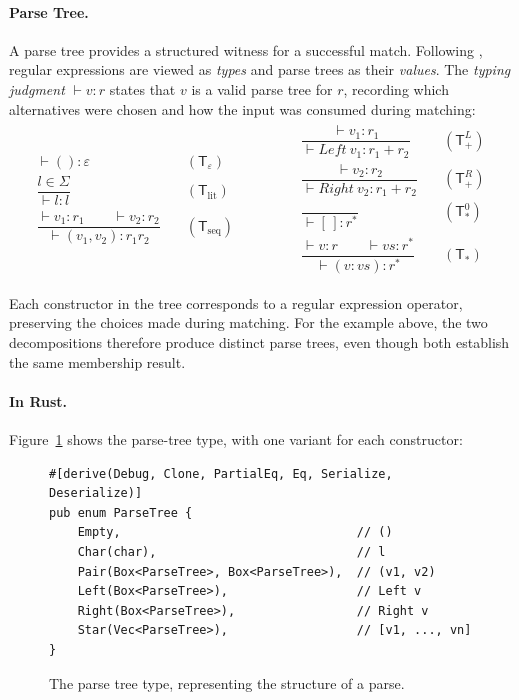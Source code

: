 \paragraph{Parse Tree.}
A parse tree provides a structured witness
for a successful match.
Following \citet[Fig.~1]{sulzmannlu2014},
regular expressions are viewed as \emph{types}
and parse trees as their \emph{values}.
The \emph{typing judgment} $\vdash v : r$
states that $v$ is a valid parse tree for $r$,
recording which alternatives were chosen
and how the input was consumed during matching:
\begin{equation}
\label{eq:typing-rules}
\begin{aligned}
\begin{aligned}
\vdash () : \varepsilon
&
\quad(\mathsf{T}_{\varepsilon})
\\[1.0em]
\dfrac{l \in \Sigma}{\vdash l : l}
&
\quad(\mathsf{T}_{\mathrm{lit}})
\\[1.4em]
\dfrac{\vdash v_1 : r_1 \qquad \vdash v_2 : r_2}
      {\vdash (v_1,v_2) : r_1 r_2}
&
\quad(\mathsf{T}_{\mathrm{seq}})
\end{aligned}
\qquad\qquad
\begin{aligned}
\dfrac{\vdash v_1 : r_1}
      {\vdash \mathit{Left}\ v_1 : r_1 + r_2}
&
\quad(\mathsf{T}_{+}^{L})
\\[1.4em]
\dfrac{\vdash v_2 : r_2}
      {\vdash \mathit{Right}\ v_2 : r_1 + r_2}
&
\quad(\mathsf{T}_{+}^{R})
\\[1.4em]
\dfrac{}{\vdash [\,] : r^{*}}
&
\quad(\mathsf{T}_{*}^{0})
\\[1.4em]
\dfrac{\vdash v : r \qquad \vdash vs : r^{*}}
      {\vdash (v:vs) : r^{*}}
&
\quad(\mathsf{T}_{*})
\end{aligned}
\end{aligned}
\end{equation}

Each constructor in the tree corresponds to a regular expression
operator, preserving the choices made during matching.
For the example above, the two decompositions therefore produce
distinct parse trees, even though both establish the same membership result.

%

\paragraph{In Rust.}
Figure~\ref{fig:parsetree-enum}
shows the parse-tree type, with one variant for each constructor:
\begin{figure}[H]
\small
\begin{verbatim}
#[derive(Debug, Clone, PartialEq, Eq, Serialize, Deserialize)]
pub enum ParseTree {
    Empty,                                 // ()
    Char(char),                            // l
    Pair(Box<ParseTree>, Box<ParseTree>),  // (v1, v2)
    Left(Box<ParseTree>),                  // Left v
    Right(Box<ParseTree>),                 // Right v
    Star(Vec<ParseTree>),                  // [v1, ..., vn]
}
\end{verbatim}
\caption{The parse tree type, representing the structure of a parse.}
\label{fig:parsetree-enum}
\end{figure}

